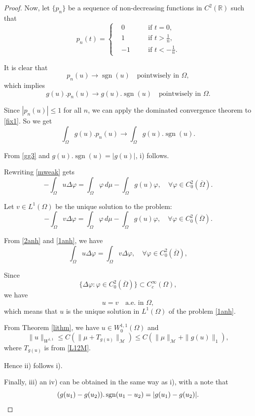 \documentclass[a4paper, 11pt]{report}
\theoremstyle{definition}\newtheorem*{rmk}{Remark}
\DeclareMathOperator{\sgn}{sgn}
\begin{document}
\begin{proof}
Now, let $\{p_n\}$ be a sequence of non-decreasing functions in $C^2(\mathbb{R})$ such that
\[
p_n(t) = \left\{
\begin{aligned}
& 0 \quad &&\text{if } t=0,\\
& 1 \quad &&\text{if } t > \frac{1}{n},\\
& -1 \quad &&\text{if } t < -\frac{1}{n}.
\end{aligned}
\right.
\]

It is clear that
\[
p_n(u)\to \sgn(u)\quad\text{pointwisely in }\Omega,
\]
which implies
\begin{equation}\label{fix1}
g(u).p_n(u)\to g(u).\sgn(u)\quad\text{pointwisely in }\Omega.
\end{equation}

Since $|p_n(u)|\le 1$ for all $n$, we can apply the dominated convergence theorem to \eqref{fix1}. So we get
\[
\int_{\Omega} g(u).p_n (u)\to \int_{\Omega} g(u).\sgn (u).
\]

From \eqref{gg3} and $g(u).\sgn (u) = |g(u)|$, i) follows.

Rewriting \eqref{mweak} gets
\begin{equation}\label{2anh}
-\int_{\Omega}u\Delta\varphi = \int_{\Omega}\varphi\, d\mu  - \int_{\Omega} g(u)\varphi, \quad  \forall \varphi \in C^2_0(\overline{\Omega}).
\end{equation}

Let $v\in L^1(\Omega)$ be the unique solution to the problem:
\begin{equation}\label{1anh}
-\int_{\Omega}v\Delta\varphi = \int_{\Omega}\varphi\, d\mu  - \int_{\Omega} g(u)\varphi, \quad  \forall \varphi \in C^2_0(\overline{\Omega}).
\end{equation}

From \eqref{2anh} and \eqref{1anh}, we have
\[
\int_{\Omega}u\Delta\varphi = \int_{\Omega}v\Delta\varphi, \quad  \forall \varphi \in C^2_0(\overline{\Omega}),
\]

Since
\[
\{\Delta \varphi : \varphi \in C^2_0(\overline{\Omega})\} \subset C_c^{\infty}(\Omega),
\]
we have
\[
u = v\quad \text{a.e.\ in } \Omega,
\]
which means that $u$ is the unique solution in $L^1(\Omega)$ of the problem \eqref{1anh}.

From Theorem \ref{lithm}, we have $u\in W^{1,1}_0(\Omega)$ and
\[
\| u \|_{W^{1,1}} \le C(\| \mu + T_{g(u)} \|_{\mathcal{M}})\le C(\|\mu\|_{\mathcal{M}} + \|g(u)\|_1),
\]
where $T_{g(u)}$ is from \eqref{L12M}.

Hence ii) follows i).

Finally, iii) an iv) can be obtained in the same way as i), with a note that
\[
(g(u_1)-g(u_2)).\sgn(u_1 - u_2) = |g(u_1) - g(u_2)|.\qedhere
\]
\end{proof}
\end{document}
